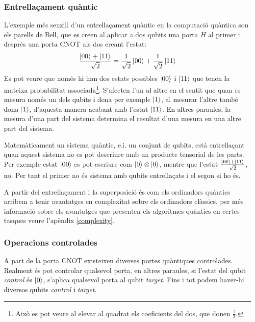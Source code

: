 \subsubsection{Entrellaçament quàntic}
L'exemple més senzill d'un entrellaçament quàntic en la computació quàntica son els parells de Bell, que es creen al aplicar a dos qubits una porta $H$ al primer i després una porta $\mathrm{CNOT}$ als dos creant l'estat:
$$
\frac{\ket{00}+\ket{11}}{\sqrt{2}} = \frac{1}{\sqrt{2}}\ket{00} + \frac{1}{\sqrt{2}}\ket{11}
$$
Es pot veure que només hi han dos estats possibles $\ket{00}$ i $\ket{11}$ que tenen la mateixa probabilitat associada\footnote{Això es pot veure al elevar al quadrat els coeficients del dos, que donen $\frac{1}{2}$.}. S'afecten l'un al altre en el sentit que quan es mesura només un dels qubits i dona per exemple $\ket{1}$, al mesurar l'altre també dona $\ket{1}$, d'aquesta manera acabant amb l'estat $\ket{11}$. En altres paraules, la mesura d'una part del sistema determina el resultat d'una mesura en una altre part del sistema.

Matemàticament un sistema quàntic, e.i. un conjunt de qubits, està entrellaçant quan aquest sistema no es pot descriure amb un producte tensorial de les parts. Per exemple estat $\ket{00}$ es pot escriure com $\ket{0}\otimes\ket{0}$, mentre que l'estat $\frac{\ket{00} + \ket{11}}{\sqrt{2}}$, no. Per tant el primer no és sistema amb qubits entrellaçats i el segon si ho és.

A partir del entrellaçament i la superposició és com els ordinadors quàntics arribem a tenir avantatges en complexitat sobre els ordinadors clàssics, per més informació sobre els avantatges que presenten els algoritmes quàntics en certes tasques veure l'apèndix \ref{complexity}. 

\subsubsection{Operacions controlades}
A part de la porta $\mathrm{CNOT}$ existeixen diverses portes quàntiques controlades. Realment és pot controlar qualsevol porta, en altres paraules, si l'estat del qubit \textit{control} és $\ket{0}$, s'aplica qualsevol porta al qubit \textit{target}. Fins i tot podem haver-hi diversos qubits \textit{control} i \textit{target}. 

